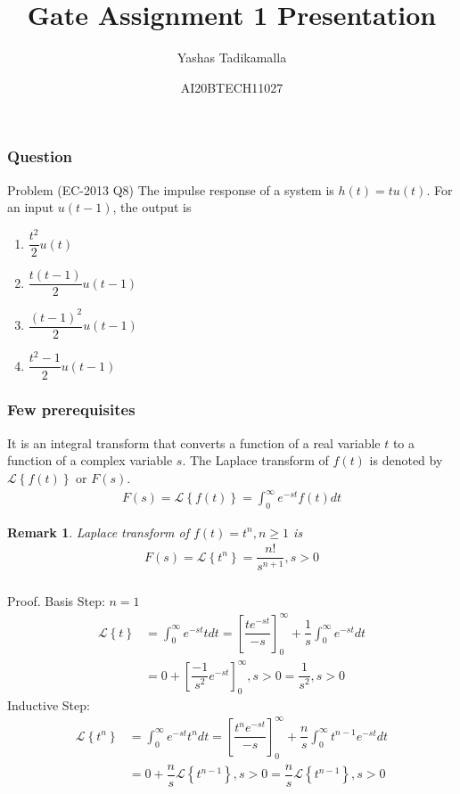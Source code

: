 \documentclass{beamer}
\title{Gate Assignment 1 Presentation}
\author{Yashas Tadikamalla}
\date{AI20BTECH11027}
\newtheorem*{remark}{Remark}
\providecommand{\sbrak}[1]{\ensuremath{{}\left[#1\right]}}
\providecommand{\cbrak}[1]{\ensuremath{\left\{#1\right\}}}
\begin{document}
\begin{frame}
\titlepage
\end{frame}
\begin{frame}
\frametitle{Question}
\begin{block}{Problem (EC-2013 Q8)}
The impulse response of a system is $h(t)=tu(t)$. For an input $u(t-1)$, the output is 
\begin{enumerate}
    \item $\dfrac{t^{2}}{2}u(t)$
    \item $\dfrac{t(t-1)}{2}u(t-1)$
    \item $\dfrac{(t-1)^{2}}{2}u(t-1)$
    \item $\dfrac{t^{2}-1}{2}u(t-1)$
\end{enumerate}
\end{block}
\end{frame}

\begin{frame}
\frametitle{Few prerequisites}
\begin{definition}
It is an integral transform that converts a function of a real variable $t$ to a function of a complex variable $s$. The Laplace transform of $f(t)$ is denoted by $\mathcal{L}\cbrak{f(t)}$ or $F(s)$.
\begin{align}
    F(s)=\mathcal{L}\cbrak{f(t)}=\int_{0}^{\infty}e^{-st}f(t)dt
\end{align}
\end{definition}
\begin{remark}
Laplace transform of $f(t)=t^n,n\geq1$ is
\begin{align}
    F(s)=\mathcal{L}\cbrak{t^n}=\dfrac{n!}{s^{n+1}},s>0
    \label{eq:t}
\end{align}
\end{remark}
\end{frame}


\begin{frame}
\frametitle{}
\begin{block}{Proof.}
Basis Step: $n=1$
\begin{align}
    \mathcal{L}\cbrak{t}&=\int_{0}^{\infty}e^{-st}tdt=\sbrak{\dfrac{te^{-st}}{-s}}_{0}^{\infty}+\dfrac{1}{s}\int_{0}^{\infty}e^{-st}dt\\
    &=0+\sbrak{\dfrac{-1}{s^2}e^{-st}}_{0}^{\infty},s>0=\dfrac{1}{s^2},s>0
\end{align}
Inductive Step:
\begin{align}
    \mathcal{L}\cbrak{t^n}&=\int_{0}^{\infty}e^{-st}t^ndt=\sbrak{\dfrac{t^{n}e^{-st}}{-s}}_{0}^{\infty}+\dfrac{n}{s}\int_{0}^{\infty}t^{n-1}e^{-st}dt\\
    &=0+\dfrac{n}{s}\mathcal{L}\cbrak{t^{n-1}},s>0=\dfrac{n}{s}\mathcal{L}\cbrak{t^{n-1}},s>0\label{eq:e}
\end{align}
\end{block}
\end{frame}
\end{document}
